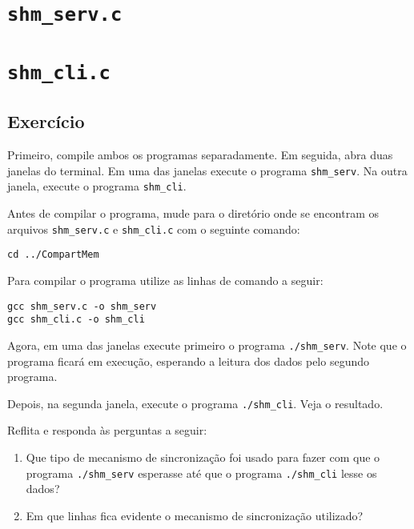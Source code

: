 
\section*{\texttt{shm\_serv.c}}



\section*{\texttt{shm\_cli.c}}


\subsection{Exercício}

Primeiro, compile ambos os programas separadamente. Em seguida, abra duas janelas do terminal. Em uma das janelas execute o programa  \texttt{shm\_serv}. Na outra janela, execute o programa \texttt{shm\_cli}.

Antes de compilar o programa, mude para o diretório onde se encontram os arquivos \texttt{shm\_serv.c} e \texttt{shm\_cli.c} com o seguinte comando:
\begin{lstlisting}[style=MyBashStyle]
cd ../CompartMem
\end{lstlisting}


Para compilar o programa utilize as linhas de comando a seguir:
\begin{lstlisting}[style=MyBashStyle]
gcc shm_serv.c -o shm_serv
gcc shm_cli.c -o shm_cli
\end{lstlisting}

Agora, em uma das janelas execute primeiro o programa \texttt{./shm\_serv}. Note que o programa ficará em execução, esperando a leitura dos dados pelo segundo programa.

Depois, na segunda janela, execute o programa \texttt{./shm\_cli}. Veja o resultado.

Reflita e responda às perguntas a seguir: 
\begin{enumerate}
    \item Que tipo de mecanismo de sincronização foi usado para fazer com que o programa \texttt{./shm\_serv} esperasse até que o programa \texttt{./shm\_cli} lesse os dados?
    \item Em que linhas fica evidente o mecanismo de sincronização utilizado?
\end{enumerate}
    
